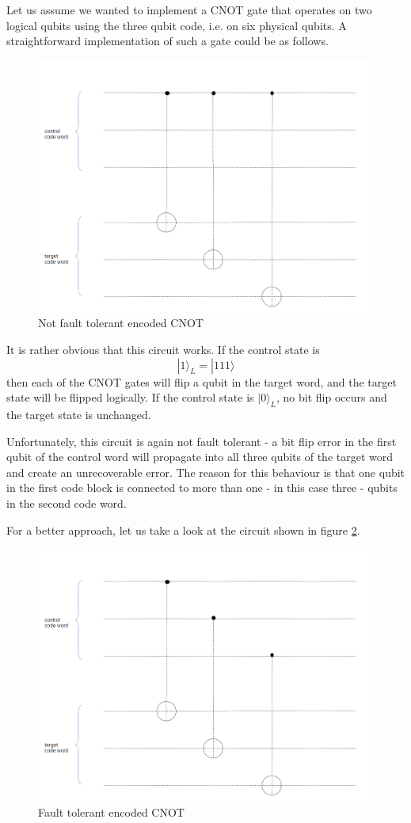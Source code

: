 \documentclass[a4paper, draft]{article}
\theoremstyle{own}
\theoremstyle{remark}
\begin{document}
Let us assume we wanted to implement a CNOT gate that operates on two logical qubits using the three qubit code, i.e. on six physical qubits. A straightforward implementation of such a gate could be as follows.

\begin{figure}[ht]
\centering
\includegraphics[width=0.7\linewidth]{images/EncodedCNOT_One}
\caption[Not fault tolerant encoded CNOT]{Not fault tolerant encoded CNOT}
\label{fig:EncodedCNOT_One}
\end{figure}

It is rather obvious that this circuit works. If the control state is 
$$
|1 \rangle_L = |111 \rangle
$$
then each of the CNOT gates will flip a qubit in the target word, and the target state will be flipped logically. If the control state is $|0 \rangle_L$, no bit flip occurs and the target state is unchanged.

Unfortunately, this circuit is again not fault tolerant - a bit flip error in the first qubit of the control word will propagate into all three qubits of the target word and create an unrecoverable error. The reason for this behaviour is that one qubit in the first code block is connected to more than one - in this case three - qubits in the second code word. 

For a better approach, let us take a look at the circuit shown in figure \ref{fig:EncodedCNOT_Two}. 

\begin{figure}[ht]
\centering
\includegraphics[width=0.7\linewidth]{images/EncodedCNOT_Two}
\caption[Fault tolerant encoded CNOT]{Fault tolerant encoded CNOT}
\label{fig:EncodedCNOT_Two}
\end{figure}
\end{document}
